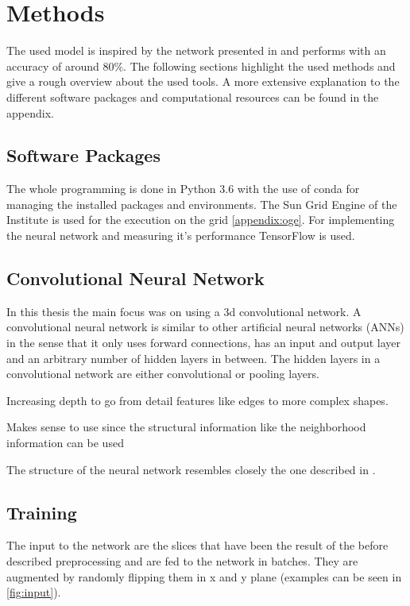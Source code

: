 \documentclass[main.tex]{subfiles}
\begin{document}
\chapter{Methods}\label{chap:03methods}
The used model is inspired by the network presented in \cite{huang2017lung} and performs with an accuracy of around 80$\%$. The following sections highlight the used methods and give a rough overview about the used tools. A more extensive explanation to the different software packages and computational resources can be found in the appendix.

\section{Software Packages}
The whole programming is done in Python 3.6 with the use of conda for managing the installed packages and environments. The Sun Grid Engine of the Institute is used for the execution on the grid \ref{appendix:oge}. For implementing the neural network and measuring it's performance TensorFlow is used.

\section{Convolutional Neural Network}
In this thesis the main focus was on using a 3d convolutional network. A convolutional neural network is similar to other artificial neural networks (ANNs) in the sense that it only uses forward connections, has an input and output layer and an arbitrary number of hidden layers in between. The hidden layers in a convolutional network are either convolutional or pooling layers. 

Increasing depth to go from detail features like edges to more complex shapes.

Makes sense to use since the structural information like the neighborhood information can be used


The structure of the neural network resembles closely the one described in \cite{huang2017lung}. 



\section{Training}

The input to the network are the slices that have been the result of the before described preprocessing and are fed to the network in batches. They are augmented by randomly flipping them in x and y plane (examples can be seen in \ref{fig:input}). 
\end{document}
